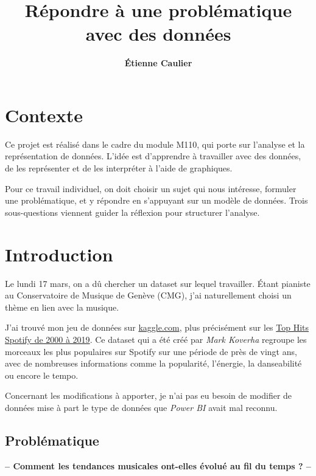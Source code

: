 \documentclass[french]{article}
\newcommand{\newLine}{\vspace{0.2cm}}
\newcommand{\interruption}[1]{\vspace{0.1cm} \begin{center} \textbf{{-- #1 --}} \end{center} \vspace{0.1cm}}
\begin{document}
\title{\Huge{\textbf{Répondre à une problématique avec des données}}}
\author{\Large{\textbf{Étienne Caulier}}}
\maketitle

\newpage
\thispagestyle{empty}
\tableofcontents
\clearpage

\section{Contexte}
Ce projet est réalisé dans le cadre du module M110, qui porte sur l'analyse et la représentation de données. L'idée est d'apprendre à travailler avec des données, de les représenter et de les interpréter à l'aide de graphiques. \newLine

Pour ce travail individuel, on doit choisir un sujet qui nous intéresse, formuler une problématique, et y répondre en s'appuyant sur un modèle de données. Trois sous-questions viennent guider la réflexion pour structurer l'analyse.

\section{Introduction}
Le lundi 17 mars, on a dû chercher un dataset sur lequel travailler. Étant pianiste au Conservatoire de Musique de Genève (CMG), j'ai naturellement choisi un thème en lien avec la musique. \newLine

J'ai trouvé mon jeu de données sur \href{https://www.kaggle.com/datasets}{kaggle.com}, plus précisément sur les \href{https://www.kaggle.com/datasets/paradisejoy/top-hits-spotify-from-20002019}{Top Hits Spotify de 2000 à 2019}. Ce dataset qui a été créé par \textit{Mark Koverha} regroupe les morceaux les plus populaires sur Spotify sur une période de près de vingt ans, avec de nombreuses informations comme la popularité, l'énergie, la danseabilité ou encore le tempo. \newLine

Concernant les modifications à apporter, je n'ai pas eu besoin de modifier de données mise à part le type de données que \textit{Power BI} avait mal reconnu.

\subsection{Problématique}
\interruption{Comment les tendances musicales ont-elles évolué au fil du temps ?}
\end{document}
